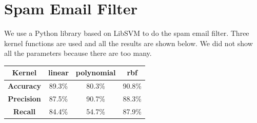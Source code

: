 \documentclass{article}
\begin{document}
\section{Spam Email Filter}
We use a Python library based on LibSVM to do the spam email filter. Three kernel functions are used and all the results are shown below. We did not show all the parameters because there are too many.
\begin{center}
\begin{tabular}{|c|c|c|c|}
\hline \bf{Kernel} & linear & polynomial & rbf \\
\hline \bf{Accuracy} & 89.3\% & 80.3\% & 90.8\% \\
\hline \bf{Precision} & 87.5\% & 90.7\% & 88.3\% \\
\hline \bf{Recall} & 84.4\% & 54.7\% & 87.9\% \\
\hline
\end{tabular}
\end{center}
\end{document}
